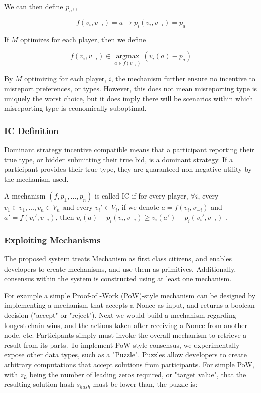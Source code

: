 \documentclass[12pt, titlepage, twocolumn]{report}
\begin{document}
We can then define \(p_a,\),

\begin{equation}
f (v_i, v_{-i}) = a \rightarrow p_i (v_i,v_{-i}) = p_a 
\end{equation}

If \(M\) optimizes for each player, then we define

\begin{equation}
f(v_i, v_{-i}) \in \operatorname*{argmax}_{  a \in f(v_{-i})  } (v_i(a) - p_a)
\end{equation}

By \(M\) optimizing for each player, \(i\), the mechanism further ensure no incentive to misreport preferences, or types. However, this does not mean misreporting type is uniquely the worst choice, but it does imply there will be scenarios within which misreporting type is economically suboptimal.

\subsubsection{IC Definition}
Dominant strategy incentive compatible means that a participant reporting their true type, or bidder submitting their true bid, is a dominant strategy. If a participant provides their true type, they are guaranteed non negative utility by the mechanism used.

A mechanism \((f, p_1, \ldots , p_n)\) is called IC if for every player, \( \forall i \), every \(v_1 \in v_1, \ldots , v_n \in V_n \) and every \(  v_{i}{'} \in V_i \), if we denote \(a = f(v_i,v_{-i})\) and \(a_{}{'} = f(v_{i}{'},v_{-i})\), then \(v_i(a) - p_i(v_i,v_{-i}) \geq v_i(a_{}{'}) - p_i(v_{i}{'},v_{-i})\) \cite{DEM} \cite{AGT} \cite{ICM}.


\subsubsection{Exploiting Mechanisms}
\indent
The proposed system treats Mechanism as first class citizens, and enables developers to create mechanisms, and use them as primitives. Additionally, consensus within the system is constructed using at least one mechanism.

For example a simple Proof-of -Work (PoW)-style mechanism can be designed by implementing a mechanism that accepts a Nonce as input, and returns a boolean decision ("accept" or "reject"). Next we would build a mechanism regarding longest chain wins, and the actions taken after receiving a Nonce from another node, etc. Participants simply must invoke the overall mechanism to retrieve a result from its parts. To implement PoW-style consensus, we experimentally expose other data types, such as a "Puzzle". Puzzles allow developers to create arbitrary computations that accept solutions from participants. For simple PoW, with \(z_L\) being the number of leading zeros required, or "target value", that the resulting solution hash \(s_{hash}\) must be lower than, the puzzle is:
\end{document}
